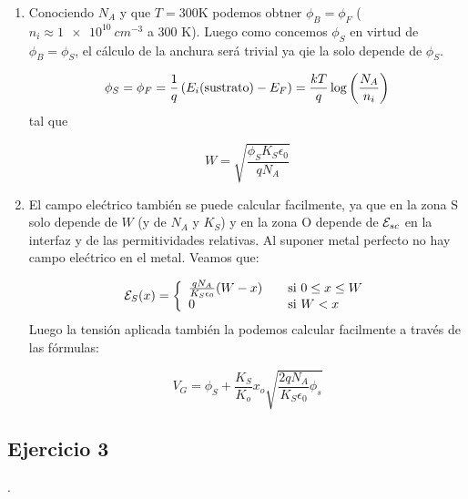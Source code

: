 \begin{enumerate}[label=\alph*)]
\item Conociendo $N_A$ y que $T=300$K podemos obtner $\phi_B = \phi_F$ ($n_i \approx \SI{1e10}{cm^{-3}}$ a 300 K). Luego como concemos $\phi_S$ en virtud de $\phi_B = \phi_S$, el cálculo de la anchura será trivial ya qie la solo depende de $\phi_S$. 

\begin{equation*}
	\phi_S = \phi_F = \frac{1}{q} \left( E_i(\text{sustrato})-E_F \right) = \frac{kT}{q} \log \left( \frac{N_A}{n_i} \right)
\end{equation*}
tal que 

\begin{equation*}
	W = \sqrt{\frac{\phi_S K_S \epsilon_0}{qN_A}}
\end{equation*}

\item El campo elećtrico también se puede calcular facilmente, ya que en la zona S solo depende de $W$ (y de $N_A$ y $K_{S}$) y en la zona O depende de $\mathcal{E}_{sc}$ en la interfaz y de las permitividades relativas. Al suponer metal perfecto no hay campo elećtrico en el metal. Veamos que:

\begin{equation*}
	\mathcal{E}_S (x) = \left\lbrace \begin{array}{ll}
		\frac{qN_A}{K_S \epsilon_0} (W-x) & \quad \text{si} \ 0\leq x \leq W  \\
		0 & \quad \text{si} \ W<x 
	\end{array} \right.
\end{equation*}
Luego la tensión aplicada también la podemos calcular facilmente a través de las fórmulas: 

\begin{equation*}
	V_G = \phi_S + \frac{K_S}{K_o} x_o \sqrt{\frac{2qN_A}{K_S\epsilon_0} \phi_s}
\end{equation*}



\end{enumerate}



\vspace*{2em}


\begin{Enunciado}
	\subsection*{Ejercicio 3}
    
	\lipsum[1].
\end{Enunciado}

